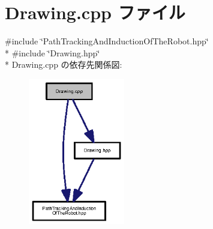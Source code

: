 \section{Drawing.\-cpp ファイル}
\label{_drawing_8cpp}
{\ttfamily \#include \char`\"{}Path\-Tracking\-And\-Induction\-Of\-The\-Robot.\-hpp\char`\"{}}\\*
{\ttfamily \#include \char`\"{}Drawing.\-hpp\char`\"{}}\\*
Drawing.\-cpp の依存先関係図\-:\nopagebreak
\begin{figure}[H]
\begin{center}
\leavevmode
\includegraphics[width=119pt]{_drawing_8cpp__incl}
\end{center}
\end{figure}
